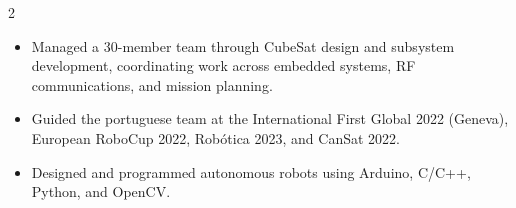 \documentclass[10pt,a4paper,ragged2e,withhyper]{altacv}
\begin{document}
\begin{paracol}{2}
            \begin{itemize}
                \item Managed a 30-member team through CubeSat design and subsystem development, coordinating work across embedded systems, RF communications, and mission planning.
            \end{itemize}

            \begin{itemize}
                \item Guided the portuguese team at the International First Global 2022 (Geneva), European RoboCup 2022, Robótica 2023, and CanSat 2022.
                \item Designed and programmed autonomous robots using Arduino, C/C++, Python, and OpenCV.
            \end{itemize}

    \end{paracol}
\end{document}
